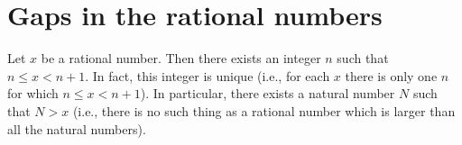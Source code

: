 \section{Gaps in the rational numbers}\label{sec 4.4}

\begin{proposition}\label{4.4.1}
    Let \(x\) be a rational number.
    Then there exists an integer \(n\) such that \(n \leq x < n + 1\).
    In fact, this integer is unique (i.e., for each \(x\) there is only one \(n\) for which \(n \leq x < n + 1\)).
    In particular, there exists a natural number \(N\) such that \(N > x\)
    (i.e., there is no such thing as a rational number which is larger than all the natural numbers).
\end{proposition}

